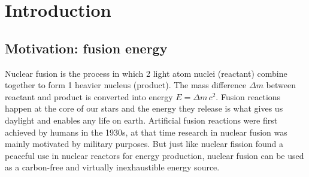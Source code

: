 \documentclass[a4paper,11pt,oneside]{report}
\begin{document}

\maketoc



\chapter{Introduction}


\section{Motivation: fusion energy}
Nuclear fusion is the process in which 2 light atom nuclei (reactant) combine together to form 1 heavier nucleus (product). The mass difference $\Delta m$ between reactant and product is converted into energy $E=\Delta m \, c^2$. Fusion reactions happen at the core of our stars and the energy they release is what gives us daylight and enables any life on earth. Artificial fusion reactions were first achieved by humans in the 1930s, at that time research in nuclear fusion was mainly motivated by military purposes. But just like nuclear fission found a peaceful use in nuclear reactors for energy production, nuclear fusion can be used as a carbon-free and virtually inexhaustible energy source.
\end{document}
